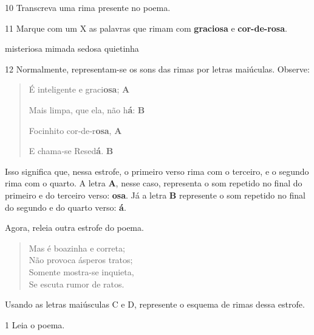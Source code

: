 \num{10} Transcreva uma rima presente no poema.


\num{11} Marque com um X as palavras que rimam com \textbf{graciosa} e \textbf{cor-de-rosa}.

\begin{boxlist}
 misteriosa
 mimada
 sedosa
 quietinha
\end{boxlist}

\num{12} Normalmente, representam-se os sons das rimas por letras maiúculas. Observe:

\begin{quote}
É inteligente e graci\textbf{osa}; \textbf{A}

Mais limpa, que ela, não h\textbf{á}: \textbf{B}

Focinhito cor‑de‑r\textbf{osa}, \textbf{A}

E chama‑se Resed\textbf{á}. \textbf{B}
\end{quote}

Isso significa que, nessa estrofe, o primeiro verso rima com o terceiro, e o segundo rima com o quarto. A letra \textbf{A}, nesse caso, representa o som repetido no final do primeiro e do terceiro verso: \textbf{osa}. Já a letra \textbf{B} represente o som repetido no final do segundo e do quarto verso: \textbf{á}.

Agora, releia outra estrofe do poema.

\begin{verse}
Mas é boazinha e correta;\\
Não provoca ásperos tratos;\\
Somente mostra-se inquieta,\\
Se escuta rumor de ratos.
\end{verse}

Usando as letras maiúsculas C e D, represente o esquema de rimas dessa estrofe.



\num{1} Leia o poema.

